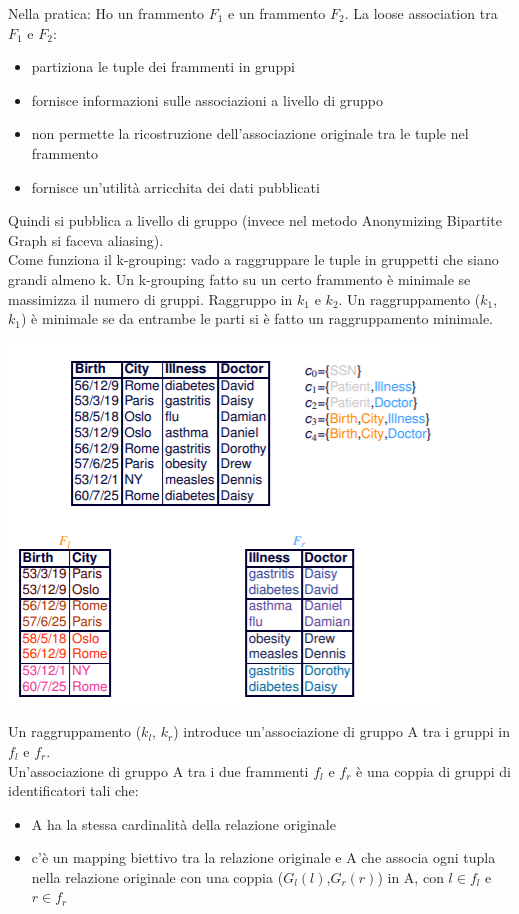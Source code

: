 Nella pratica: Ho un frammento \(F_1\) e un frammento \(F_2\). La loose association tra \(F_1\) e \(F_2\):
\begin{itemize}
    \item partiziona le tuple dei frammenti in gruppi
    \item fornisce informazioni sulle associazioni a livello di gruppo
    \item non permette la ricostruzione dell'associazione originale tra le tuple nel frammento
    \item fornisce un'utilità arricchita dei dati pubblicati
\end{itemize}
Quindi si pubblica a livello di gruppo (invece nel metodo Anonymizing Bipartite Graph si faceva aliasing). \\
Come funziona il k-grouping: vado a raggruppare le tuple in gruppetti che siano grandi almeno k. Un k-grouping fatto su un certo frammento è minimale se massimizza il numero di gruppi. Raggruppo in \(k_1\) e \(k_2\). Un raggruppamento (\(k_1\), \(k_1\)) è minimale se da entrambe le parti si è fatto un raggruppamento minimale.\\
\begin{center}
    \includegraphics[scale=0.7]{img/Mingroup1.png}
\end{center}
Un raggruppamento (\(k_l\), \(k_r\)) introduce un'associazione di gruppo A tra i gruppi in \(f_l\) e \(f_r\). \\
Un'associazione di gruppo A tra i due frammenti \(f_l\) e \(f_r\) è una coppia di gruppi di identificatori tali che:
\begin{itemize}
    \item A ha la stessa cardinalità della relazione originale
    \item c'è un mapping biettivo tra la relazione originale e A che associa ogni tupla nella relazione originale con una coppia (\(G_l(l)\),\(G_r(r)\)) in A, con \(l \in f_l\) e \(r \in f_r\)
\end{itemize}
